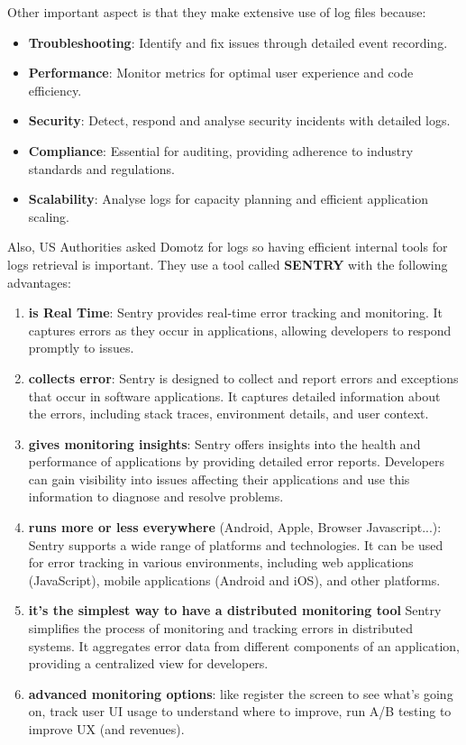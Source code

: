 Other important aspect is that they make extensive use of log files because:
\begin{itemize}
   \item \textbf{Troubleshooting}: Identify and fix issues through detailed event recording.
   \item \textbf{Performance}: Monitor metrics for optimal user experience and code efficiency.
   \item \textbf{Security}: Detect, respond and analyse security incidents with detailed logs.
   \item \textbf{Compliance}: Essential for auditing, providing adherence to industry standards and regulations.
   \item \textbf{Scalability}: Analyse logs for capacity planning and efficient application scaling.
\end{itemize}
Also, US Authorities asked Domotz for logs so having efficient internal tools for logs retrieval is important. They use a tool called \textbf{SENTRY} with the following advantages:
\begin{enumerate}
   \item \textbf{is Real Time}: Sentry provides real-time error tracking and monitoring. It captures errors as they occur in applications, allowing developers to respond promptly to issues.
   \item \textbf{collects error}: Sentry is designed to collect and report errors and exceptions that occur in software applications. It captures detailed information about the errors, including stack traces, environment details, and user context.
   \item \textbf{gives monitoring insights}: Sentry offers insights into the health and performance of applications by providing detailed error reports. Developers can gain visibility into issues affecting their applications and use this information to diagnose and resolve problems.
   \item \textbf{runs more or less everywhere} (Android, Apple, Browser Javascript...): Sentry supports a wide range of platforms and technologies. It can be used for error tracking in various environments, including web applications (JavaScript), mobile applications (Android and iOS), and other platforms.
   \item \textbf{it's the simplest way to have a distributed monitoring tool} Sentry simplifies the process of monitoring and tracking errors in distributed systems. It aggregates error data from different components of an application, providing a centralized view for developers.
   \item \textbf{advanced monitoring options}: like register the screen to see what's going on, track user UI usage to understand where to improve, run A/B testing to improve UX (and revenues).
\end{enumerate}

